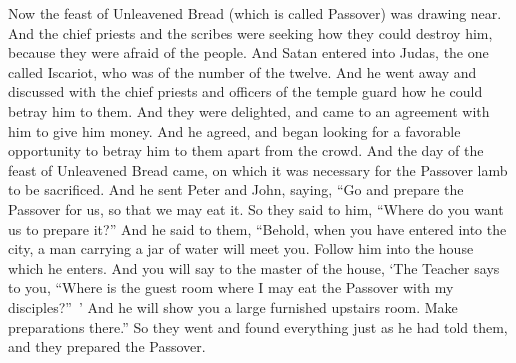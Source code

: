 \begin{biblechapter} %
 Now the feast of Unleavened Bread (which is called Passover) was drawing near.
\verse And the chief priests and the scribes were seeking how they could destroy him, because they were afraid of the people.
 And Satan entered into Judas, the one called Iscariot, who was of the number of the twelve.
\verse And he went away and discussed with the chief priests and officers of the temple guard how he could betray him to them.
\verse And they were delighted, and came to an agreement with him to give him money.
\verse And he agreed, and began looking for a favorable opportunity to betray him to them apart from the crowd.
 And the day of the feast of Unleavened Bread came, on which it was necessary for the Passover lamb to be sacrificed.
\verse And he sent Peter and John, saying, “Go and prepare the Passover for us, so that we may eat it.
\verse So they said to him, “Where do you want us to prepare it?”
\verse And he said to them, “Behold, when you have entered into the city, a man carrying a jar of water will meet you. Follow him into the house which he enters.
\verse And you will say to the master of the house, ‘The Teacher says to you, “Where is the guest room where I may eat the Passover with my disciples?” ’
\verse And he will show you a large furnished upstairs room. Make preparations there.”
\verse So they went and found everything just as he had told them, and they prepared the Passover.

\end{biblechapter}
